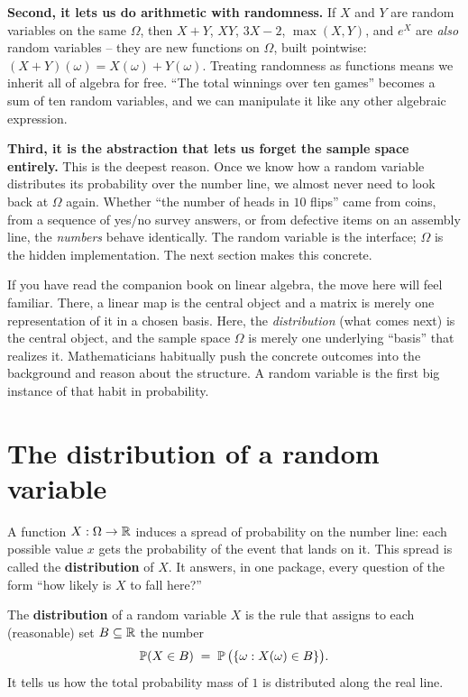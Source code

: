 \textbf{Second, it lets us do arithmetic with randomness.} If $X$ and $Y$ are random
variables on the same $\Omega$, then $X + Y$, $XY$, $3X - 2$, $\max(X,Y)$, and
$e^{X}$ are \emph{also} random variables -- they are new functions on $\Omega$,
built pointwise: $(X+Y)(\omega) = X(\omega) + Y(\omega)$. Treating randomness as
functions means we inherit all of algebra for free. ``The total winnings over ten
games'' becomes a sum of ten random variables, and we can manipulate it like any other
algebraic expression.

\textbf{Third, it is the abstraction that lets us forget the sample space entirely.}
This is the deepest reason. Once we know how a random variable distributes its
probability over the number line, we almost never need to look back at $\Omega$ again.
Whether ``the number of heads in $10$ flips'' came from coins, from a sequence of
yes/no survey answers, or from defective items on an assembly line, the \emph{numbers}
behave identically. The random variable is the interface; $\Omega$ is the hidden
implementation. The next section makes this concrete.

\begin{connectionbox}
If you have read the companion book on linear algebra, the move here will feel
familiar. There, a linear map is the central object and a matrix is merely one
representation of it in a chosen basis. Here, the \emph{distribution} (what comes next)
is the central object, and the sample space $\Omega$ is merely one underlying ``basis''
that realizes it. Mathematicians habitually push the concrete outcomes into the
background and reason about the structure. A random variable is the first
big instance of that habit in probability.
\end{connectionbox}

\section{The distribution of a random variable}
\label{ch06:distribution}

A function $X : \Omega \to \mathbb{R}$ induces a spread of probability on the number line: each possible value $x$ gets the probability of the event that lands on it. This spread is called the \textbf{distribution} of $X$. It answers, in one
package, every question of the form ``how likely is $X$ to fall here?''

\begin{definition}[Distribution]
\label{ch06:def-distribution}
The \textbf{distribution} of a random variable $X$ is the rule that assigns to each
(reasonable) set $B \subseteq \mathbb{R}$ the number
\[
  \operatorname{\mathbb{P}}(X \in B) \;=\; \operatorname{\mathbb{P}}\big(\{\omega : X(\omega) \in B\}\big).
\]
It tells us how the total probability mass of $1$ is distributed along the real line.
\end{definition}

